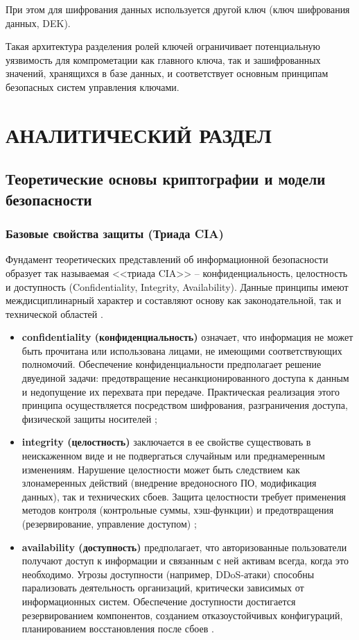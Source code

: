 \documentclass[14pt, a4paper]{extarticle}
\begin{document}
	При этом для шифрования данных используется другой ключ (ключ шифрования данных, DEK).
	
	Такая архитектура разделения ролей ключей ограничивает потенциальную уязвимость для компрометации как главного ключа, так и зашифрованных значений, хранящихся в базе данных, и соответствует основным принципам безопасных систем управления ключами.
	
	\newpage
	
	\section[Аналитический раздел]{АНАЛИТИЧЕСКИЙ РАЗДЕЛ}
	
	\subsection{Теоретические основы криптографии и модели безопасности}
	\subsubsection{Базовые свойства защиты (Триада CIA)}
	
	Фундамент теоретических представлений об информационной безопасности образует так называемая <<триада CIA>> -- конфиденциальность, целостность и доступность (Confidentiality, Integrity, Availability). Данные принципы имеют междисциплинарный характер и составляют основу как законодательной, так и технической областей \cite{milnichuk}.
	
	\begin{itemize}
	\item \textbf{confidentiality (конфиденциальность)} означает, что информация не может быть прочитана или использована лицами, не имеющими соответствующих полномочий. Обеспечение
	конфиденциальности предполагает решение двуединой задачи: предотвращение несанкционированного доступа к данным и недопущение их перехвата при передаче.
	Практическая реализация этого принципа осуществляется посредством шифрования, разграничения доступа, физической защиты носителей \cite{milnichuk};
	\item \textbf{integrity (целостность)} заключается в ее свойстве существовать в неискаженном виде и не подвергаться случайным или преднамеренным изменениям. Нарушение целостности может быть следствием как злонамеренных действий (внедрение вредоносного
	ПО, модификация данных), так и технических сбоев. Защита целостности требует применения методов контроля (контрольные суммы, хэш-функции) и предотвращения (резервирование, управление доступом) \cite{milnichuk};
	\item \textbf{availability (доступность)} предполагает, что авторизованные пользователи получают доступ к информации и связанным с ней активам всегда, когда это необходимо. Угрозы доступности (например, DDoS-атаки) способны парализовать деятельность организаций, критически зависимых от информационных систем. Обеспечение доступности достигается резервированием компонентов, созданием отказоустойчивых конфигураций, планированием восстановления после сбоев \cite{milnichuk}.
	\end{itemize}
	
\end{document}
